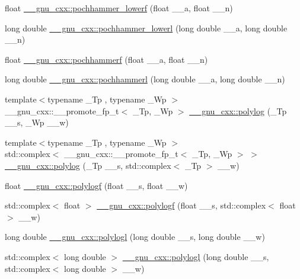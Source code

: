 \begin{DoxyCompactItemize}
float \hyperlink{group__gnu__math__spec__func_gad8a0f1a68021c9b5efafd6230b578224}{\+\_\+\+\_\+gnu\+\_\+cxx\+::pochhammer\+\_\+lowerf} (float \+\_\+\+\_\+a, float \+\_\+\+\_\+n)
\item 
long double \hyperlink{group__gnu__math__spec__func_gad6457ba41c5cfe350e9ab3434cfc8950}{\+\_\+\+\_\+gnu\+\_\+cxx\+::pochhammer\+\_\+lowerl} (long double \+\_\+\+\_\+a, long double \+\_\+\+\_\+n)
\item 
float \hyperlink{group__gnu__math__spec__func_ga8e1312229e1bb432ae36010f8e53f8cd}{\+\_\+\+\_\+gnu\+\_\+cxx\+::pochhammerf} (float \+\_\+\+\_\+a, float \+\_\+\+\_\+n)
\item 
long double \hyperlink{group__gnu__math__spec__func_ga3b60f88a723ed82c6323303136b07de7}{\+\_\+\+\_\+gnu\+\_\+cxx\+::pochhammerl} (long double \+\_\+\+\_\+a, long double \+\_\+\+\_\+n)
\item 
{\footnotesize template$<$typename \+\_\+\+Tp , typename \+\_\+\+Wp $>$ }\\\+\_\+\+\_\+gnu\+\_\+cxx\+::\+\_\+\+\_\+promote\+\_\+fp\+\_\+t$<$ \+\_\+\+Tp, \+\_\+\+Wp $>$ \hyperlink{group__gnu__math__spec__func_gac2e50fbb0f648209e667af0111277134}{\+\_\+\+\_\+gnu\+\_\+cxx\+::polylog} (\+\_\+\+Tp \+\_\+\+\_\+s, \+\_\+\+Wp \+\_\+\+\_\+w)
\item 
{\footnotesize template$<$typename \+\_\+\+Tp , typename \+\_\+\+Wp $>$ }\\std\+::complex$<$ \+\_\+\+\_\+gnu\+\_\+cxx\+::\+\_\+\+\_\+promote\+\_\+fp\+\_\+t$<$ \+\_\+\+Tp, \+\_\+\+Wp $>$ $>$ \hyperlink{group__gnu__math__spec__func_ga665f8375c4e48394bca251d8bf8379f9}{\+\_\+\+\_\+gnu\+\_\+cxx\+::polylog} (\+\_\+\+Tp \+\_\+\+\_\+s, std\+::complex$<$ \+\_\+\+Tp $>$ \+\_\+\+\_\+w)
\item 
float \hyperlink{group__gnu__math__spec__func_ga5bcdd35473144a6d8efc258a79bc82d8}{\+\_\+\+\_\+gnu\+\_\+cxx\+::polylogf} (float \+\_\+\+\_\+s, float \+\_\+\+\_\+w)
\item 
std\+::complex$<$ float $>$ \hyperlink{group__gnu__math__spec__func_ga5376edb72358b777035a78b929deb49f}{\+\_\+\+\_\+gnu\+\_\+cxx\+::polylogf} (float \+\_\+\+\_\+s, std\+::complex$<$ float $>$ \+\_\+\+\_\+w)
\item 
long double \hyperlink{group__gnu__math__spec__func_ga3aa007b4b4e345c30be015ab145d5598}{\+\_\+\+\_\+gnu\+\_\+cxx\+::polylogl} (long double \+\_\+\+\_\+s, long double \+\_\+\+\_\+w)
\item 
std\+::complex$<$ long double $>$ \hyperlink{group__gnu__math__spec__func_ga9eb79e506eda210610bc59c1912b4d0f}{\+\_\+\+\_\+gnu\+\_\+cxx\+::polylogl} (long double \+\_\+\+\_\+s, std\+::complex$<$ long double $>$ \+\_\+\+\_\+w)

\end{DoxyCompactItemize}
